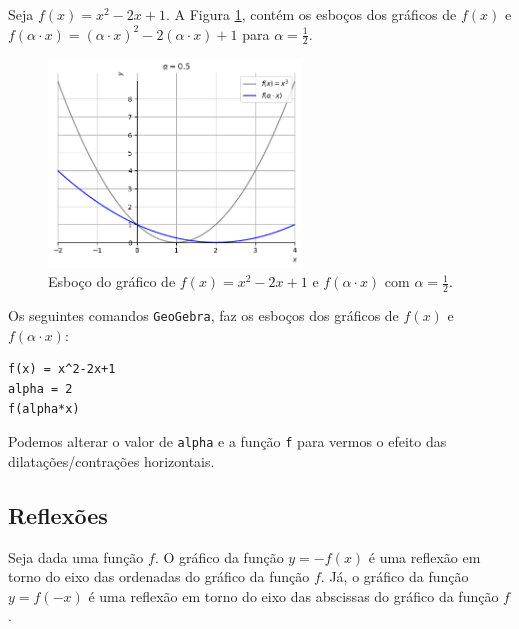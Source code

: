 \documentclass[../main.tex]{subfiles}
\begin{document}
\begin{ex}
  Seja $f(x) = x^2-2x+1$. A Figura \ref{fig:ex_dilahoriz}, contém os esboços dos gráficos de $f(x)$ e $f(\alpha\cdot x) = (\alpha \cdot x)^2-2(\alpha\cdot x) + 1$ para $\alpha = \frac{1}{2}$.

  \begin{figure}[htb]
    \centering
    \includegraphics[width=0.6\textwidth]{fig_func/fig_ex_dilahoriz}
    \caption{Esboço do gráfico de $f(x) = x^2-2x+1$ e $f(\alpha\cdot x)$ com $\alpha=\frac{1}{2}$.}
    \label{fig:ex_dilahoriz}
  \end{figure}

    Os seguintes comandos \verb+GeoGebra+, faz os esboços dos gráficos de $f(x)$ e $f(\alpha\cdot x)$:
\begin{verbatim}
f(x) = x^2-2x+1
alpha = 2
f(alpha*x)
\end{verbatim}
  Podemos alterar o valor de \verb+alpha+ e a função \verb+f+ para vermos o efeito das dilatações/contrações horizontais.
  \end{ex}
  
\subsection{Reflexões}
Seja dada uma função $f$. O gráfico da função $y = -f(x)$ é uma reflexão em torno do eixo das ordenadas do gráfico da função $f$. Já, o gráfico da função $y = f(-x)$ é uma reflexão em torno do eixo das abscissas do gráfico da função $f$.\\
\end{document}

